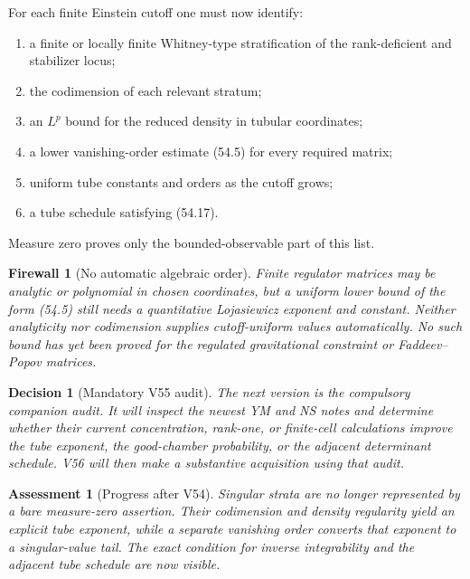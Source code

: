 \documentclass[11pt]{article}
\newtheorem{assessment}[theorem]{Assessment}
\newtheorem{firewall}[theorem]{Firewall}
\newtheorem{decision}[theorem]{Decision}
\begin{document}
\begin{ledger}
\label{led:v11v54-strata}
For each finite Einstein cutoff one must now identify:
\begin{enumerate}
\item a finite or locally finite Whitney-type stratification of the
rank-deficient and stabilizer locus;
\item the codimension of each relevant stratum;
\item an \(L^p\) bound for the reduced density in tubular coordinates;
\item a lower vanishing-order estimate (54.5) for every required
matrix;
\item uniform tube constants and orders as the cutoff grows;
\item a tube schedule satisfying (54.17).
\end{enumerate}
Measure zero proves only the bounded-observable part of this list.
\end{ledger}

\begin{firewall}[No automatic algebraic order]
\label{fire:v11v54-algebraic}
Finite regulator matrices may be analytic or polynomial in chosen
coordinates, but a uniform lower bound of the form (54.5) still needs
a quantitative Lojasiewicz exponent and constant.  Neither analyticity
nor codimension supplies cutoff-uniform values automatically.
No such bound has yet been proved for the regulated gravitational
constraint or Faddeev--Popov matrices.
\end{firewall}

\begin{decision}[Mandatory V55 audit]
\label{dec:v11v54-next}
The next version is the compulsory companion audit.  It will inspect
the newest YM and NS notes and determine whether their current
concentration, rank-one, or finite-cell calculations improve the
tube exponent, the good-chamber probability, or the adjacent
determinant schedule.  V56 will then make a substantive acquisition
using that audit.
\end{decision}

\begin{assessment}[Progress after V54]
\label{ass:v11v54-status}
Singular strata are no longer represented by a bare measure-zero
assertion.  Their codimension and density regularity yield an explicit
tube exponent, while a separate vanishing order converts that exponent
to a singular-value tail.  The exact condition for inverse
integrability and the adjacent tube schedule are now visible.
\end{assessment}
\end{document}
